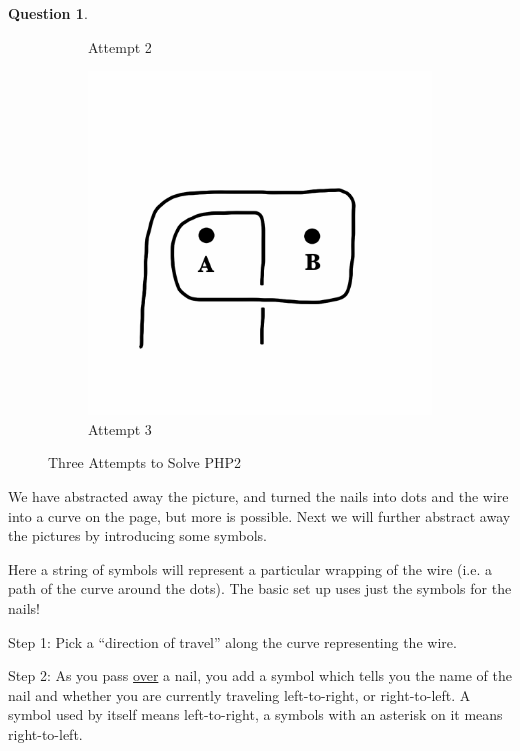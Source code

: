 \documentclass[12pt,letterpaper]{article}
\theoremstyle{definition}
\newtheorem{question}{Question}
\begin{document}
\begin{question}
\begin{figure}[h!]
\begin{subfigure}[b]{0.3\textwidth}
        \caption{Attempt 2}
    \end{subfigure}
    \begin{subfigure}[b]{0.3\textwidth}
        \includegraphics[width=\textwidth]{rgp01pics/attempt3.png}
        \caption{Attempt 3}
    \end{subfigure}
    \caption{Three Attempts to Solve PHP2}
\end{figure}
\end{question}

We have abstracted away the picture, and turned the nails into dots and the wire into a curve on the page, but more is possible.
Next we will further abstract away the pictures by introducing some symbols.

Here a string of symbols will represent a particular wrapping of the wire (i.e. a path of the curve around the dots).
The basic set up uses just the symbols for the nails!

\noindent
Step 1: Pick a ``direction of travel'' along the curve representing the wire.

\noindent
Step 2: As you pass \underline{over} a nail, you add a symbol which tells you the name of the nail and whether you are currently traveling left-to-right, or right-to-left. A symbol used by itself means left-to-right, a symbols with an asterisk on it means right-to-left.
\end{document}
